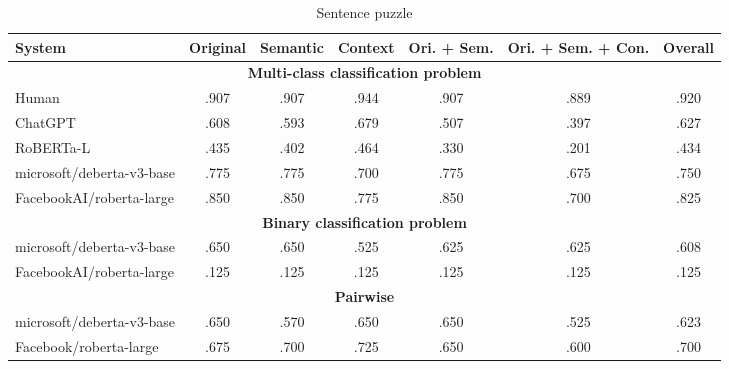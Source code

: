 \begin{table*}
	\caption{Sentence puzzle}
	\label{tab:sentence-results-table}
	\begin{center}
		\begin{tabular}{lcccccc}
			\toprule
			\textbf{System}           & \textbf{Original} & \textbf{Semantic} & \textbf{Context} & \textbf{Ori. + Sem.} & \textbf{Ori. + Sem. + Con.} & \textbf{Overall} \\
			\midrule
			\multicolumn{7}{c}{\textbf{Multi-class classification problem}}                                                                                              \\
			\midrule
			\color{gray}Human         & \color{gray}.907  & \color{gray}.907  & \color{gray}.944 & \color{gray}.907     & \color{gray}.889            & \color{gray}.920 \\
			\color{gray}ChatGPT       & \color{gray}.608  & \color{gray}.593  & \color{gray}.679 & \color{gray}.507     & \color{gray}.397            & \color{gray}.627 \\
			\color{gray}RoBERTa-L     & \color{gray}.435  & \color{gray}.402  & \color{gray}.464 & \color{gray}.330     & \color{gray}.201            & \color{gray}.434 \\
			\midrule
			microsoft/deberta-v3-base & .775              & .775              & .700             & .775                 & .675                        & .750             \\
			FacebookAI/roberta-large  & .850              & .850              & .775             & .850                 & .700                        & .825             \\
			\midrule
			\multicolumn{7}{c}{\textbf{Binary classification problem}}                                                                                                   \\
			microsoft/deberta-v3-base & .650              & .650              & .525             & .625                 & .625                        & .608             \\
			FacebookAI/roberta-large  & .125              & .125              & .125             & .125                 & .125                        & .125             \\
			\midrule
			\multicolumn{7}{c}{\textbf{Pairwise}}                                                                                                                        \\
			\midrule
			microsoft/deberta-v3-base & .650              & .570              & .650             & .650                 & .525                        & .623             \\
			Facebook/roberta-large    & .675              & .700              & .725             & .650                 & .600                        & .700             \\
			\bottomrule
		\end{tabular}
	\end{center}
\end{table*}

